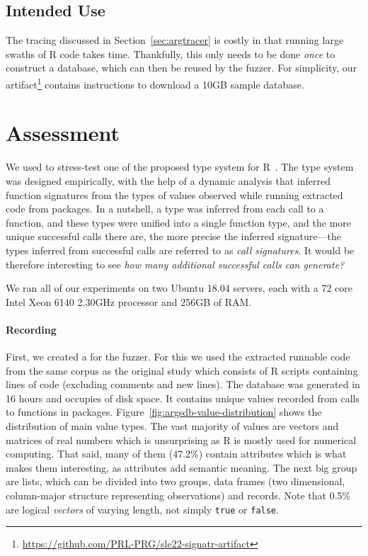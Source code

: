 \documentclass[sigplan,screen]{acmart}
\begin{document}


\subsection{Intended Use}
\label{sec:intended-use}

The tracing discussed in Section~\ref{sec:argtracer} is costly in that running large swaths of R code takes time.
Thankfully, this only needs to be done \textit{once} to construct a database, which can then be reused by the fuzzer.
For simplicity, our artifact\footnote{\url{https://github.com/PRL-PRG/sle22-signatr-artifact}} contains instructions to download a 10GB sample database.

\section{Assessment}
\label{sec:assessment}


We used \tool to stress-test one of the proposed type system for
R~\cite{turcotte2020designing}.  The type system was designed
empirically, with the help of a dynamic analysis that inferred
function signatures from the types of values observed while running
extracted code from packages.  In a nutshell, a type was inferred from
each call to a function, and these types were unified into a single
function type, and the more unique successful calls there are, the
more precise the inferred signature---the types inferred from
successful calls are referred to as \textit{call signatures}.  It
would be therefore interesting to see \emph{how many additional
successful calls can \tool generate?}

We ran all of our experiments on two Ubuntu 18.04 servers, each with a
72 core Intel Xeon 6140 2.30GHz processor and 256GB of RAM.

\paragraph{Recording}

First, we created a \sxpdb for the fuzzer.
For this we used the extracted runnable code from the same corpus as the original study which consists of \DBNumSourceFiles R scripts containing \DBSourceLinesOfCodeRnd lines of code (excluding comments and new lines).
The database was generated in 16 hours and occupies \DBFileSize of disk space.
It contains \DBValuesRnd unique values recorded from \DBNumCallsRnd calls to \DBNumFunctionsRnd functions in \DBNumPackages packages.
Figure~\ref{fig:argsdb-value-distribution} shows the distribution of main value types.
The vast majority of values are vectors and matrices of real numbers which is unsurprising as R is mostly used for numerical computing.
That said, many of them (47.2\%) contain attributes which is what makes them interesting, as attributes add semantic meaning.
The next big group are lists, which can be divided into two groups, data frames (two dimensional, column-major structure representing observations) and records.
Note that 0.5\% are logical \textit{vectors} of varying length, not simply {\tt true} or {\tt false}. 
\end{document}
